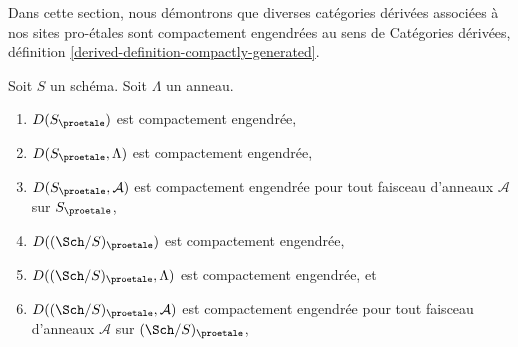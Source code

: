 \noindent
Dans cette section, nous démontrons que diverses catégories dérivées associées
à nos sites pro-\'etales sont compactement engendrées au sens de
Catégories dérivées, définition \ref{derived-definition-compactly-generated}.

\begin{lemma}
\label{lemma-enough-compact-proetale}
Soit $S$ un schéma. Soit $\Lambda$ un anneau.
\begin{enumerate}
\item $D(S_\proetale)$ est compactement engendrée,
\item $D(S_\proetale, \Lambda)$ est compactement engendrée,
\item $D(S_\proetale, \mathcal{A})$ est compactement engendrée
pour tout faisceau d'anneaux $\mathcal{A}$ sur $S_\proetale$,
\item $D((\Sch/S)_\proetale)$ est compactement engendrée,
\item $D((\Sch/S)_\proetale, \Lambda)$ est compactement engendrée, et
\item $D((\Sch/S)_\proetale, \mathcal{A})$ est compactement engendrée
pour tout faisceau d'anneaux $\mathcal{A}$ sur $(\Sch/S)_\proetale$,
\end{enumerate}
\end{lemma}

